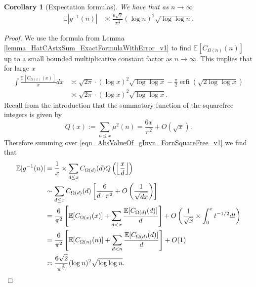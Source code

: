 \documentclass[11pt,reqno,a4letter]{article}
\numberwithin{figure}{section}
\numberwithin{table}{section}
\newcommand{\Floor}[2]{\ensuremath{\left\lfloor \frac{#1}{#2} \right\rfloor}}
\theoremstyle{plain}
\newtheorem{cor}[theorem]{Corollary}
\numberwithin{theorem}{section}
\theoremstyle{definition}
\begin{document}
\begin{cor}[Expectation formulas] 
\label{cor_ExpectationFormulaAbsgInvn_v2} 
We have that as $n \rightarrow \infty$ 
\begin{align*} 
\mathbb{E}|g^{-1}(n)| & \asymp \frac{6 \sqrt{2}}{\pi^{\frac{3}{2}}} 
     (\log n)^2 \sqrt{\log\log n}. 
\end{align*} 
\end{cor} 
\begin{proof} 
We use the formula from Lemma \ref{lemma_HatCAstxSum_ExactFormulaWithError_v1} 
to find $\mathbb{E}[C_{\Omega(n)}(n)]$ up to a small bounded multiplicative 
constant factor as $n \rightarrow \infty$.
This implies that for large $x$ 
\begin{align*} 
\int \frac{\mathbb{E}[C_{\Omega(x)}(x)]}{x} dx & \asymp 
     \sqrt{2\pi} \cdot (\log x)^2 \sqrt{\log\log x} - 
     \frac{\pi}{2} \operatorname{erfi}\left(\sqrt{2\log\log x}\right) \\ 
     & \asymp \sqrt{2\pi} \cdot (\log x)^2 \sqrt{\log\log x}. 
\end{align*} 
Recall from the introduction that the summatory function of the 
squarefree integers is given by 
\[
Q(x) := \sum_{n \leq x} \mu^2(n) = \frac{6x}{\pi^2} + O(\sqrt{x}). 
\]
Therefore summing over \eqref{eqn_AbsValueOf_gInvn_FornSquareFree_v1} 
we find that  
\begin{align} 
\notag 
\mathbb{E}|g^{-1}(n)| & = \frac{1}{x} \times \sum_{d \leq x} 
     C_{\Omega(d)}(d) Q\left(\Floor{x}{d}\right) \\ 
\notag 
     & \sim \sum_{d \leq x} C_{\Omega(d)}(d) \left[\frac{6}{d \cdot \pi^2} + O\left(\frac{1}{\sqrt{dx}}\right) 
     \right] \\ 
\notag 
     & = \frac{6}{\pi^2} \left[\mathbb{E}[C_{\Omega(x)}(x)] + \sum_{d<x} 
     \frac{\mathbb{E}[C_{\Omega(d)}(d)]}{d}\right] + 
     O\left(\frac{1}{\sqrt{x}} \times \int_0^{x} t^{-1/2} dt\right) \\ 
\label{eqn_proof_tag_ExpAbsgInvn_ExpandedByExpsOfCkn_v1} 
     & = \frac{6}{\pi^2}\left[\mathbb{E}[C_{\Omega(n)}(n)] + 
     \sum_{d<n} \frac{\mathbb{E}[C_{\Omega(d)}(d)]}{d}\right] + O(1) \\ 
\notag 
     & \asymp \frac{6 \sqrt{2}}{\pi^{\frac{3}{2}}} (\log n)^2 \sqrt{\log\log n}. 
     \qedhere 
\end{align} 
\end{proof} 
\end{document}
